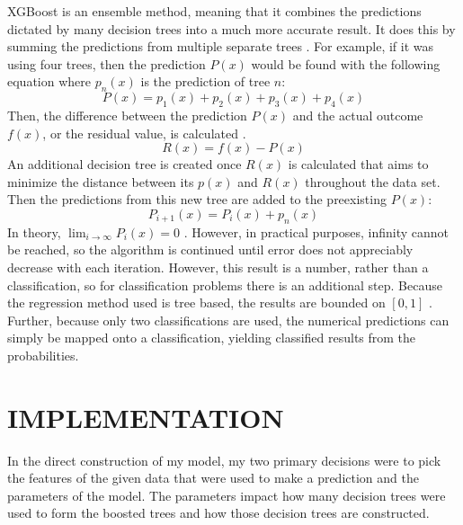 \documentclass[12pt]{article}
\begin{document}
    XGBoost is an ensemble method, meaning that it combines the predictions dictated by many decision trees into a much more accurate result. It does this by summing the predictions from multiple separate trees \cite{three}. For example, if it was using four trees, then the prediction $P(x)$ would be found with the following equation where $p_{n}(x)$ is the prediction of tree $n$:
    \begin{equation}
      P(x) = p_{1}(x) + p_{2}(x) + p_{3}(x) + p_{4}(x)
    \end{equation}
    Then, the difference between the prediction $P(x)$ and the actual outcome $f(x)$, or the residual value, is calculated \cite{three}.
    \begin{equation}
      R(x) = f(x) - P(x)
    \end{equation}
    An additional decision tree is created once $R(x)$ is calculated that aims to minimize the distance between its $p(x)$
    and $R(x)$ throughout the data set. Then the predictions from this new tree are added to the preexisting $P(x)$:
      \begin{equation}
        P_{i+1}(x) = P_i(x) + p_n(x)
      \end{equation}
    In theory, $\lim_{i \to \infty} P_i(x) = 0$ \cite{mason2000boosting}. However, in practical purposes, infinity cannot be reached, so the algorithm is continued until error does not appreciably decrease with each iteration. However, this result is a number, rather than a classification, so for classification problems there is an additional step. Because the regression method used is tree based, the results are bounded on $[0,1]$ \cite{classificationexplanation}. Further, because only two classifications are used, the numerical predictions can simply be mapped onto a classification, yielding classified results from the probabilities.

  \section{IMPLEMENTATION}
    In the direct construction of my model, my two primary decisions were to pick the features of the given data that were used to make a prediction and the parameters of the model. The parameters impact how many decision trees were used to form the boosted trees and how those decision trees are constructed.
\end{document}
